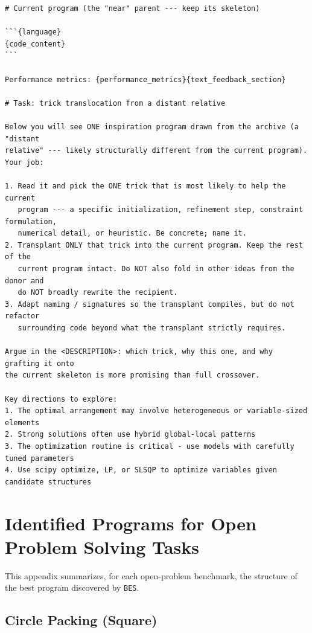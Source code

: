 \documentclass{llmxive}
\providecommand{\ours}{\texttt{BES}}
\begin{document}
\begin{ttcolorbox}
\begin{lstlisting}[style=prompt]
# Current program (the "near" parent --- keep its skeleton)

```{language}
{code_content}
```

Performance metrics: {performance_metrics}{text_feedback_section}

# Task: trick translocation from a distant relative

Below you will see ONE inspiration program drawn from the archive (a "distant
relative" --- likely structurally different from the current program). Your job:

1. Read it and pick the ONE trick that is most likely to help the current
   program --- a specific initialization, refinement step, constraint formulation,
   numerical detail, or heuristic. Be concrete; name it.
2. Transplant ONLY that trick into the current program. Keep the rest of the
   current program intact. Do NOT also fold in other ideas from the donor and
   do NOT broadly rewrite the recipient.
3. Adapt naming / signatures so the transplant compiles, but do not refactor
   surrounding code beyond what the transplant strictly requires.

Argue in the <DESCRIPTION>: which trick, why this one, and why grafting it onto
the current skeleton is more promising than full crossover.

Key directions to explore:
1. The optimal arrangement may involve heterogeneous or variable-sized elements
2. Strong solutions often use hybrid global-local patterns
3. The optimization routine is critical - use models with carefully tuned parameters
4. Use scipy optimize, LP, or SLSQP to optimize variables given candidate structures
\end{lstlisting}
\end{ttcolorbox}




\section{Identified Programs for Open Problem Solving Tasks}
\label{app:program}

This appendix summarizes, for each open-problem benchmark, the structure of
the best program discovered by \ours{}.

\subsection{Circle Packing (Square)}
\label{app:program:cp}
\end{document}
